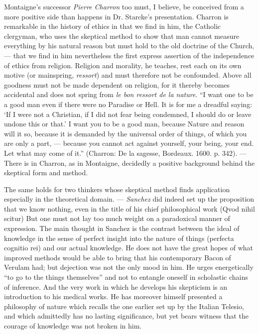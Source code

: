 \documentclass[12pt,a4paper,openany]{book}
\newcommand{\opage}[1]{\marginnote{\footnotesize\textit{[#1]}}}
\begin{document}
Montaigne's successor \emph{Pierre Charron} too must, I believe,
be conceived from a more positive side than happens in Dr.
Starcke's presentation. Charron is remarkable in the history of ethics
in that we find in him, the Catholic clergyman, who uses
the skeptical method to show that man cannot
measure everything by his natural reason but must hold to the
old doctrine of the Church, --- that we find in him nevertheless the first
express assertion of the independence of ethics from religion.
Religion and morality, he teaches, rest each on its own motive
(or mainspring, \emph{ressort}) and must therefore not be confounded.
Above all goodness must not be made dependent on religion,
for it thereby becomes accidental and does not spring from \emph{le bon
ressort de la nature}. ``I want one to be a good
man even if there were no Paradise or Hell.
It is for me a dreadful saying: `If I were not
a Christian, if I did not fear being condemned, I should
do or leave undone this or that.' I want you to be
a good man, because Nature and reason will it so,
because it is demanded by the universal order of things, of which
you are only a part, --- because you cannot act against yourself,
your being, your end. Let what may come of it.'' (Charron: De la sagesse, Bordeaux. 1600. p.
342). --- There is in Charron, as in Montaigne,
decidedly a positive background behind the skeptical form and
method.

The same holds for two thinkers whose
skeptical method finds application especially in the theoretical
domain. --- \emph{Sanchez} did indeed set up the proposition that
we know nothing, even in the title of his chief philosophical work
\opage{21}(Qvod nihil scitur) But one must not lay too much
weight on a paradoxical manner of expression. The main thought in
Sanchez is the contrast between the ideal of knowledge in the
sense of perfect insight into the nature of things (perfecta
cognitio rei) and our actual knowledge. He does not have the great
hopes of what improved methods would be able to bring
that his contemporary Bacon of Verulam had; but dejection was
not the only mood in him. He urges energetically
``to go to the things themselves'' and not to entangle oneself in scholastic
chains of inference. And the very work in which he develops
his skepticism is an introduction to his medical
works. He has moreover himself presented a philosophy of nature
which recalls the one earlier set up by the Italian Telesio,
and which admittedly has no lasting significance, but yet
bears witness that the courage of knowledge was not broken in him.
\end{document}
